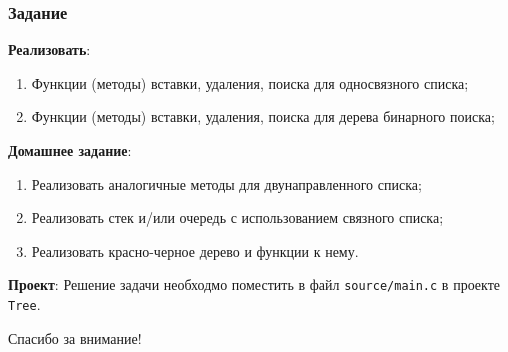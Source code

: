 \documentclass{beamer}
\begin{document}
    \begin{frame}[fragile]
        \frametitle{Задание}
        {\bf Реализовать}:
        \begin{enumerate}
            \justifying
            \item Функции (методы) вставки, удаления, поиска для односвязного списка;
            \item Функции (методы) вставки, удаления, поиска для дерева бинарного поиска;
        \end{enumerate}
        \par
        {\bf Домашнее задание}: 
        \begin{enumerate}
            \justifying
            \item Реализовать аналогичные методы для двунаправленного списка;
            \item Реализовать стек и/или очередь с использованием связного списка;
            \item {\bf*} Реализовать красно-черное дерево и функции к нему.
        \end{enumerate}
        \par
        {\bf Проект}: Решение задачи необходмо поместить в файл {\tt source/main.c} в проекте {\tt Tree}. 
    \end{frame}
    \begin{frame}
        \begin{center}
        \baselineskip 20.0mm
        \Huge Спасибо за внимание!
        \end{center}
    \end{frame}
\end{document}
